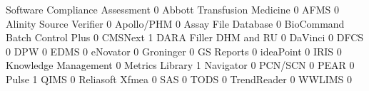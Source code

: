 \documentclass{article}
\begin{document}
\begin{Schunk}
\begin{Soutput}
                                Software Compliance Assessment
                                                             0
  Abbott Transfusion Medicine                                0
  AFMS                                                       0
  Alinity Source Verifier                                    0
  Apollo/PHM                                                 0
  Assay File Database                                        0
  BioCommand Batch Control Plus                              0
  CMSNext                                                    1
  DARA Filler DHM and RU                                     0
  DaVinci                                                    0
  DFCS                                                       0
  DPW                                                        0
  EDMS                                                       0
  eNovator                                                   0
  Groninger                                                  0
  GS Reports                                                 0
  ideaPoint                                                  0
  IRIS                                                       0
  Knowledge Management                                       0
  Metrics Library                                            1
  Navigator                                                  0
  PCN/SCN                                                    0
  PEAR                                                       0
  Pulse                                                      1
  QIMS                                                       0
  Reliasoft Xfmea                                            0
  SAS                                                        0
  TODS                                                       0
  TrendReader                                                0
  WWLIMS                                                     0
                               

\end{Soutput}
\end{Schunk}
\end{document}

